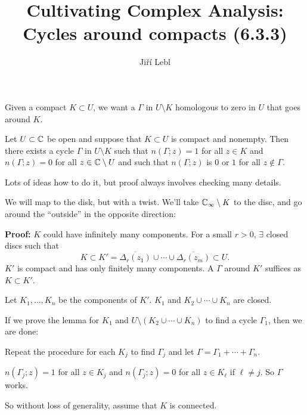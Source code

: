 \documentclass[10pt,aspectratio=169]{beamer}
\author{Ji\v{r}\'i Lebl}
\institute[OSU]{%
Departemento pri Matematiko de Oklahoma {\^S}tata Universitato}
\title{Cultivating Complex Analysis:\\%
Cycles around compacts (6.3.3)}
\date{}
\begin{document}
\begin{frame}
\titlepage
\end{frame}

\begin{frame}
Given a compact $K \subset U$, we want a $\Gamma$ in $U \setminus K$
homologous to zero in $U$ that goes around $K$.

\medskip
\pause

\begin{lemma}\label{lemma:patharoundK}
Let $U \subset {\mathbb{C}}$ be open and suppose that $K \subset U$ is compact and
nonempty.
Then there exists a cycle
$\Gamma$ in $U \setminus K$ such that $n(\Gamma;z) = 1$ for all $z \in K$ and
$n(\Gamma;z) = 0$ for all $z \in {\mathbb{C}} \setminus U$
 and such that $n(\Gamma;z)$ is $0$ or $1$ for all $z \notin
\Gamma$.
\end{lemma}

\pause
Lots of ideas how to do it, but
proof always involves checking many details.

\medskip
\pause

We will map to the disk, but with a twist.  We'll take ${\mathbb{C}}_\infty \setminus
K$ 
to the disc, and go around the ``outside'' in the opposite direction:

\begin{center}
\end{center}

\end{frame}

\begin{frame}
\textbf{Proof:}
$K$ could have infinitely many components.
\pause
For a small $r > 0$, $\exists$ closed discs such that
\[
K \subset K' = \overline{\Delta_r(z_1)} \cup \cdots \cup
\overline{\Delta_r(z_m)} \subset U .
\]
$K'$ is compact and has only finitely many components.
\pause
A $\Gamma$ around $K'$ suffices as $K \subset K'$.

\medskip
\pause

Let $K_1,\ldots,K_n$ be the components of $K'$.
\quad
\pause
$K_1$ and
$K_2 \cup \cdots \cup K_n$ are closed.
\pause

\medskip
If we prove the lemma for $K_1$ and
$U \setminus ( K_2 \cup \cdots \cup K_n )$ to find a cycle
$\Gamma_1$, then we are done:

\pause
\medskip
Repeat the procedure
for each $K_j$ to find $\Gamma_j$ and let $\Gamma = \Gamma_1 + \cdots +
\Gamma_n$.

\medskip
\pause
$n(\Gamma_j;z) = 1$ for all $z \in K_j$
\pause
and
$n(\Gamma_j;z) = 0$ for all $z \in K_\ell$ if $\ell \not= j$.
\pause
So $\Gamma$ works.

\medskip
\pause

So without loss of generality, assume that $K$ is connected.  
\end{frame}
\end{document}

